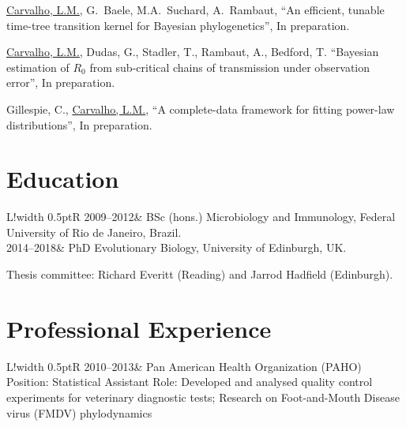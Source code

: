 \documentclass[10pt]{article}
\newcommand\VRule{\color{lightgray}\vrule width 0.5pt}
\begin{document}
\underline{Carvalho, L.M.}, G.~Baele, M.A.~Suchard, A.~Rambaut, ``{A}n efficient, tunable time-tree transition kernel for Bayesian phylogenetics'', In preparation.

\underline{Carvalho, L.M.}, Dudas, G., Stadler, T., Rambaut, A., Bedford, T.  ``Bayesian estimation of $R_0$ from sub-critical chains of transmission under observation error'', In preparation.

Gillespie, C., \underline{Carvalho, L.M.}, ``A complete-data framework for fitting power-law distributions'', In preparation.

\newpage
\section*{Education}
\begin{tabular}{L!{\VRule}R}
2009--2012& BSc (hons.) Microbiology and Immunology, Federal University of Rio de Janeiro, Brazil.\\
2014--2018& PhD Evolutionary Biology, University of Edinburgh, UK.

Thesis committee: Richard Everitt (Reading) and Jarrod Hadfield (Edinburgh).
\end{tabular}

\section*{Professional Experience}
\begin{tabular}{L!{\VRule}R}
2010--2013&{
Pan American Health Organization (PAHO)\newline
Position: Statistical Assistant\newline
Role: Developed and analysed quality control experiments for veterinary diagnostic tests;\newline
Research on Foot-and-Mouth Disease virus (FMDV) phylodynamics 
}
\end{tabular}
\end{document}
